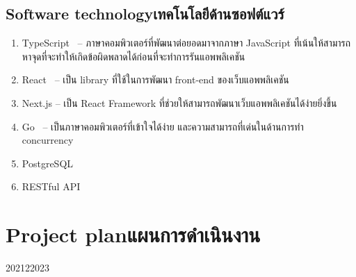 \subsection{\ifenglish Software technology\else เทคโนโลยีด้านซอฟต์แวร์\fi}
\begin{enumerate}
    \item TypeScript~\cite{typescript} -- ภาษาคอมพิวเตอร์ที่พัฒนาต่อยอดมาจากภาษา JavaScript
          ที่เน้นให้สามารถหาจุดที่จะทำให้เกิดข้อผิดพลาดได้ก่อนที่จะทำการรันแอพพลิเคชัน
    \item React~\cite{react} -- เป็น library ที่ใช้ในการพัฒนา front-end ของเว็บแอพพลิเคชัน
    \item Next.js\cite{nextjs} -- เป็น React Framework ที่ช่วยให้สามารถพัฒนาเว็บแอพพลิเคชันได้ง่ายยิ่งขึ้น
    \item Go~\cite{golang} -- เป็นภาษาคอมพิวเตอร์ที่เข้าใจได้ง่าย และความสามารถที่เด่นในด้านการทำ concurrency
    \item PostgreSQL
    \item RESTful API
\end{enumerate}

\section{\ifenglish Project plan\else แผนการดำเนินงาน\fi}
\begin{plan}{12}{2021}{2}{2023}
\end{plan}

